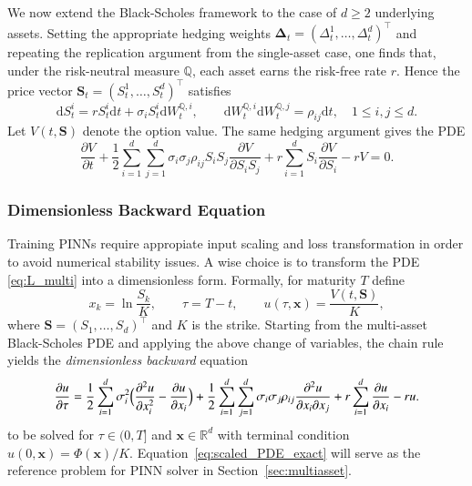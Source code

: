\documentclass[12pt]{report} %
\theoremstyle{plain} %
\theoremstyle{definition} %
\theoremstyle{remark} %
\begin{document}
We now extend the Black-Scholes framework to the case of \(d\ge2\) underlying assets. Setting the
appropriate hedging weights \(\boldsymbol{\Delta}_t=(\Delta_t^{1},\dots,\Delta_t^{d})^{\top}\) and repeating the
replication argument from the single-asset case, one finds that, under the risk-neutral measure
\(\mathbb{Q}\), each asset earns the risk-free rate \(r\). Hence the price vector
\(\mathbf{S}_t=(S_t^{1},\dots,S_t^{d})^{\top}\) satisfies
\begin{equation}\label{eq:gbm_multi_redux}
 \mathrm{d}S^i_t
 = rS^i_t\mathrm{d}t
 + \sigma_i S^i_t\mathrm{d}W^{\mathbb{Q},i}_t,
 \qquad
 \mathrm{d}W^{\mathbb{Q},i}_t\mathrm{d}W^{\mathbb{Q},j}_t
 = \rho_{ij}\mathrm{d}t,
 \quad 1\le i,j\le d.
\end{equation}
Let $V(t,\mathbf{S})$ denote the option value. The same hedging argument gives the PDE
\begin{equation}\label{eq:L_multi}
 \frac{\partial V}{\partial t} + \frac12\sum_{i=1}^d\sum_{j=1}^{d}
 \sigma_i\sigma_j\rho_{ij}
 S_iS_j\frac{\partial V}{\partial S_i S_j}
 + r\sum_{i=1}^{d}S_i\frac{\partial V}{\partial S_i}
 - rV = 0.
\end{equation}

\subsubsection{Dimensionless Backward Equation}

Training PINNs require appropiate input scaling and loss transformation in order to avoid numerical stability
issues. A wise choice is to transform the PDE \eqref{eq:L_multi} into a dimensionless form. Formally, 
for maturity \(T\) define
\[
x_k=\ln\frac{S_k}{K},\qquad
\tau=T-t,\qquad
u(\tau,\mathbf{x})=\frac{V(t,\mathbf{S})}{K},
\]
where \(\mathbf{S}=(S_1,\dots,S_d)^{\top}\) and
\(K\) is the strike. Starting from the multi-asset Black-Scholes PDE and applying 
the above change of variables, the chain rule yields the
 \emph{dimensionless backward} equation
\begin{equation}
 \frac{\partial u}{\partial \tau} =
 \frac12\sum_{i=1}^{d}\sigma_i^{2}
 \Bigl(
 \frac{\partial^{2}u}{\partial x_i^{2}}
 - \frac{\partial u}{\partial x_i}
 \Bigr)
 + \frac12\sum_{i=1}^{d}\sum_{j=1}^{d}\sigma_i\sigma_j\rho_{ij}
 \frac{\partial^{2}u}{\partial x_i\partial x_j}
 + r\sum_{i=1}^{d}\frac{\partial u}{\partial x_i}
 - ru.
 \label{eq:scaled_PDE_exact}
\end{equation}
to be solved for
\(\tau\in(0,T]\) and \(\mathbf{x}\in\mathbb{R}^{d}\) with terminal
condition \(u(0,\mathbf{x})=\Phi(\mathbf{x})/K\). Equation~\eqref{eq:scaled_PDE_exact} will serve as the reference
problem for PINN solver in Section~\ref{sec:multiasset}.
\end{document}
